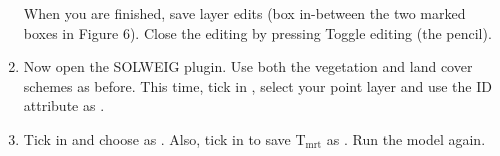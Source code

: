 \documentclass[letterpaper,10pt,english]{sphinxmanual}
\begin{document}
\begin{enumerate}
When you are
finished, save layer edits (box in-between the two marked boxes in
Figure 6). Close the editing by pressing Toggle editing (the pencil).

\item {} 
Now open the SOLWEIG plugin. Use both the vegetation and land cover
schemes as before. This time, tick in , select your
point layer and use the ID attribute as .

\item {} 
Tick in  and choose
 as . Also, tick
in to save T$_{\text{mrt}}$ as . Run the model again.

\end{enumerate}
\end{document}
